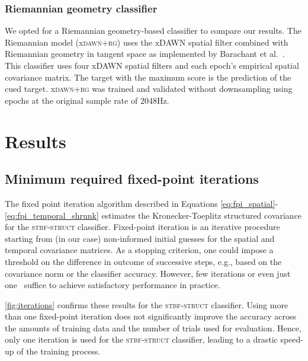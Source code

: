 	\subsubsection{Riemannian geometry classifier}
	\label{sec:riemannian}
	We opted for a Riemannian
	geometry-based classifier to compare our results.
	The Riemannian model (x\textsc{dawn+rg}) uses the xDAWN spatial filter combined
	with Riemannian geometry in tangent space as implemented by Barachant et
	al.~\cite{Barachant2014a}.
	This classifier uses four xDAWN spatial filters and each epoch's empirical spatial covariance matrix.
	The target with the maximum score is the prediction of the cued target.
	x\textsc{dawn+rg} was trained and validated without downsampling using epochs
	at the original sample rate of 2048Hz.

	\section{Results}
	\subsection{Minimum required fixed-point iterations}
	The fixed point iteration algorithm described
	in Equations \ref{eq:fpi_spatial}-\ref{eq:fpi_temporal_shrunk} estimates the Kronecker-Toeplitz structured covariance for the
	\textsc{stbf-struct} classifier.
	Fixed-point iteration is an iterative procedure starting from (in our case)
	non-informed initial guesses for the spatial and temporal covariance matrices.
	As a stopping criterion, one could impose a threshold on the difference in
	outcome of successive steps, e.g., based on the covariance norm or the
	classifier accuracy.
	However, few iterations or even just one~\cite{Castaneda2014} suffice to achieve satisfactory performance in practice.

	\autoref{fig:iterations} confirms these results for the \textsc{stbf-struct} classifier.
	Using more than one fixed-point iteration does not significantly improve the
	accuracy across the amounts of training data and the number of trials
	used for evaluation.
	Hence, only one iteration is used for the \textsc{stbf-struct} classifier, leading to a drastic speed-up of
	the training process.

